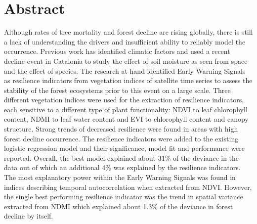\section*{Abstract}
Although rates of tree mortality and forest decline are rising globally, there is still a lack of understanding the drivers and insufficient ability to reliably model the occurrence. Previous work has identified climatic factors and used a recent decline event in Catalonia to study the effect of soil moisture as seen from space and the effect of species. The research at hand identified Early Warning Signals as resilience indicators from vegetation indices of satellite time series to assess the stability of the forest ecosystems prior to this event on a large scale. Three different vegetation indices were used for the extraction of resilience indicators, each sensitive to a different type of plant functionality: NDVI to leaf chlorophyll content, NDMI to leaf water content and EVI to chlorophyll content and canopy structure. Strong trends of decreased resilience were found in areas with high forest decline occurrence. The resilience indicators were added to the existing logistic regression model and their significance, model fit and performance were reported. Overall, the best model explained about 31\% of the deviance in the data out of which an additional 4\% was explained by the resilience indicators. The most explanatory power within the Early Warning Signals was found in indices describing temporal autocorrelation when extracted from NDVI. However, the single best performing resilience indicator was the trend in spatial variance extracted from NDMI which explained about 1.3\% of the deviance in forest decline by itself.
